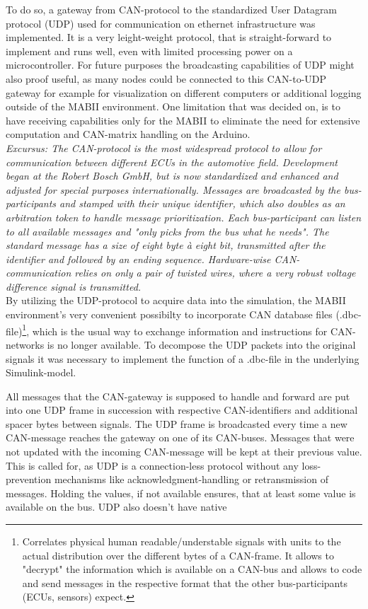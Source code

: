 \documentclass[ExampleMasters.tex]{subfiles}
\begin{document}
To do so, a gateway from CAN-protocol to the standardized User Datagram protocol (UDP) used for communication on ethernet  infrastructure was implemented. It is a very leight-weight protocol, that is straight-forward to implement and runs well, even with limited processing power on a microcontroller. For future purposes the broadcasting capabilities of UDP might also proof useful, as many nodes could be connected to this CAN-to-UDP gateway for example for visualization on different computers or additional logging outside of the MABII environment. One limitation that was decided on, is to have receiving capabilities only for the MABII to eliminate the need for extensive computation and CAN-matrix handling on the Arduino. \\


\textit{Excursus: The CAN-protocol is the most widespread protocol to allow for communication between different ECUs in the automotive field. Development began at the Robert Bosch GmbH, but is now standardized and enhanced and adjusted for special purposes internationally. Messages are broadcasted by the bus-participants and stamped with their unique identifier, which also doubles as an arbitration token to handle message prioritization. Each bus-participant can listen to all available messages and "only picks from the bus what he needs". The standard message has a size of eight byte \`{a} eight bit, transmitted after the identifier and followed by an ending sequence. Hardware-wise CAN-communication relies on only a pair of twisted wires, where a very robust voltage difference signal is transmitted. }\cite{CAN_intro}\\


By utilizing the UDP-protocol to acquire data into the simulation, the MABII environment's very convenient possibilty to incorporate CAN database files (.dbc-file)\footnote{Correlates physical human readable/understable signals with units to the actual distribution over the different bytes of a CAN-frame. It allows to "decrypt" the information which is available on a CAN-bus and allows to code and send messages in the respective format that the other bus-participants (ECUs, sensors) expect.}, which is the usual way to exchange information and instructions for CAN-networks is no longer available. To decompose the UDP packets into the original signals it was necessary to implement the function of a .dbc-file in the underlying Simulink-model. 

All messages that the CAN-gateway is supposed to handle and forward are put into one UDP frame in succession with respective CAN-identifiers and additional spacer bytes between signals. The UDP frame is broadcasted every time a new CAN-message reaches the gateway on one of its CAN-buses. Messages that were not updated with the incoming CAN-message will be kept at their previous value. This is called for, as UDP is a connection-less protocol without any loss-prevention mechanisms like acknowledgment-handling or retransmission of messages. Holding the values, if not available ensures, that at least some value is available on the bus. UDP also doesn't have native 
\end{document}
